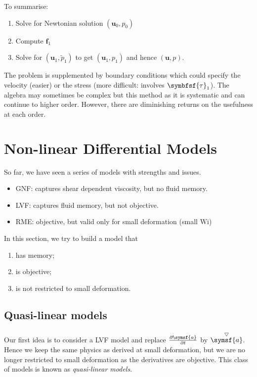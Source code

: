 \documentclass{jknotes}
\newcommand{\ucd}[1]{\stackrel{\bigtriangledown}{#1}}
\begin{document}
To summarise:
\begin{enumerate}
	\item Solve for Newtonian solution $(\symbf{u}_0, p_0)$
	\item Compute $\symbf{f}_1$
	\item Solve for $(\symbf{u}_1, \tilde{p}_1)$ to get $(\symbf{u}_1, p_1)$
		and hence $(\symbf{u},p)$.
\end{enumerate}
The problem is supplemented by boundary conditions which could specify the
velocity (easier) or the stress (more difficult: involves $\symbfsf{\tau}_1$).
The algebra may sometimes be complex but this method as it is systematic and 
can continue to higher order. However, there are diminishing returns on the
usefulness at each order. 

\section{Non-linear Differential Models}
So far, we have seen a series of models with strengths and issues.
\begin{itemize}
	\item GNF: captures shear dependent viscosity, but no fluid memory.
	\item LVF: captures fluid memory, but not objective.
	\item RME: objective, but valid only for small deformation (small
		$\text{Wi}$)
\end{itemize}
In this section, we try to build a model that
\begin{enumerate}
	\item has memory;
	\item is objective;
	\item is not restricted to small deformation.
\end{enumerate}

\subsection{Quasi-linear models}
Our first idea is to consider a LVF model and replace $\frac{\partial
\symsf{a}}{\partial t}$ by $\ucd{\symsf{a}}$. Hence we keep the same physics
as derived at small deformation, but we are no longer restricted to small
deformation as the derivatives are objective. This class of models is known as
\emph{quasi-linear models}.
\end{document}
